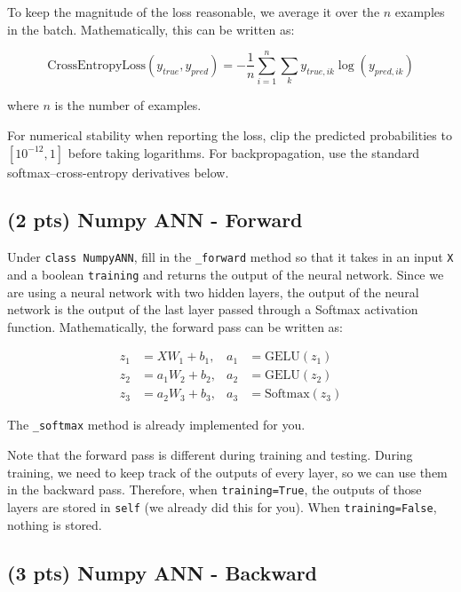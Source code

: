 \documentclass[11pt]{exam}
\begin{document}
To keep the magnitude of the loss reasonable, we average it over the $n$ examples in the batch. Mathematically, this can be written as:

$$ \text{CrossEntropyLoss}(y_{true}, y_{pred}) = - \frac{1}{n} \sum_{i=1}^n \sum_{k} y_{true, ik} \log(y_{pred, ik}) $$

where $n$ is the number of examples.

For numerical stability when reporting the loss, clip the predicted probabilities to $[10^{-12}, 1]$ before taking logarithms. For backpropagation, use the standard softmax--cross-entropy derivatives below.

\subsection{(2 pts) Numpy ANN - Forward}

Under \verb|class NumpyANN|, fill in the \verb|_forward| method so that it takes in an input \verb|X| and a boolean \verb|training| and returns the output of the neural network. Since we are using a neural network with two hidden layers, the output of the neural network is the output of the last layer passed through a Softmax activation function. Mathematically, the forward pass can be written as:

\begin{align} z_1 &= X W_1 + b_1, & a_1 &= \text{GELU}(z_1) \\ z_2 &= a_1 W_2 + b_2, & a_2 &= \text{GELU}(z_2) \\ z_3 &= a_2 W_3 + b_3, & a_3 &= \text{Softmax}(z_3) \end{align} 

The \verb|_softmax| method is already implemented for you.

Note that the forward pass is different during training and testing. During training, we need to keep track of the outputs of every layer, so we can use them in the backward pass. Therefore, when \verb|training=True|, the outputs of those layers are stored in \verb|self| (we already did this for you). When \verb|training=False|, nothing is stored.

\subsection{(3 pts) Numpy ANN - Backward}
\end{document}
